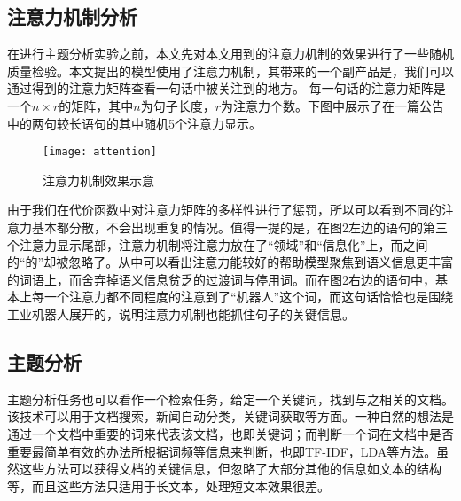 \documentclass[UTF8,11pt,a4paper,nofonts]{ctexart}
\begin{document}




\subsection{注意力机制分析}

在进行主题分析实验之前，本文先对本文用到的注意力机制的效果进行了一些随机质量检验。本文提出的模型使用了注意力机制，其带来的一个副产品是，我们可以通过得到的注意力矩阵查看一句话中被关注到的地方。
每一句话的注意力矩阵是一个$n \times r$的矩阵，其中$n$为句子长度，$r$为注意力个数。下图中展示了在一篇公告中的两句较长语句的其中随机5个注意力显示。


\begin{figure}
\centering
\texttt{[image: attention]}
\caption{注意力机制效果示意}\label{fig:02}
\end{figure} 

由于我们在代价函数中对注意力矩阵的多样性进行了惩罚，所以可以看到不同的注意力基本都分散，不会出现重复的情况。值得一提的是，在图2左边的语句的第三个注意力显示尾部，注意力机制将注意力放在了“领域”和“信息化”上，而之间的“的”却被忽略了。从中可以看出注意力能较好的帮助模型聚焦到语义信息更丰富的词语上，而舍弃掉语义信息贫乏的过渡词与停用词。而在图2右边的语句中，基本上每一个注意力都不同程度的注意到了“机器人”这个词，而这句话恰恰也是围绕工业机器人展开的，说明注意力机制也能抓住句子的关键信息。

\subsection{主题分析}

主题分析任务也可以看作一个检索任务，给定一个关键词，找到与之相关的文档。该技术可以用于文档搜索，新闻自动分类，关键词获取等方面。一种自然的想法是通过一个文档中重要的词来代表该文档，也即关键词；而判断一个词在文档中是否重要最简单有效的办法所根据词频等信息来判断，也即TF-IDF，LDA等方法。虽然这些方法可以获得文档的关键信息，但忽略了大部分其他的信息如文本的结构等，而且这些方法只适用于长文本，处理短文本效果很差。
\end{document}
